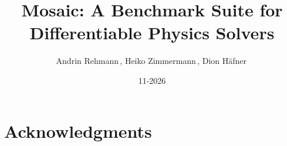 \documentclass[11pt,a4paper]{article}
\title{Mosaic: A Benchmark Suite for Differentiable Physics Solvers}
\author{Andrin Rehmann\,\orcidlink{0009-0001-6002-5096},\;
        Heiko Zimmermann\,\orcidlink{0000-0001-9190-4328},\;
        Dion Häfner\,\orcidlink{0000-0002-4465-7317}}
\date{11-2026}
\affiliation{Pasteur Labs, Brooklyn, NY, USA}
\begin{document}

\maketitle

\begin{plabstract}

\end{plabstract}




\section*{Acknowledgments}


\PLrefheading


\clearpage

\appendix


\end{document}
